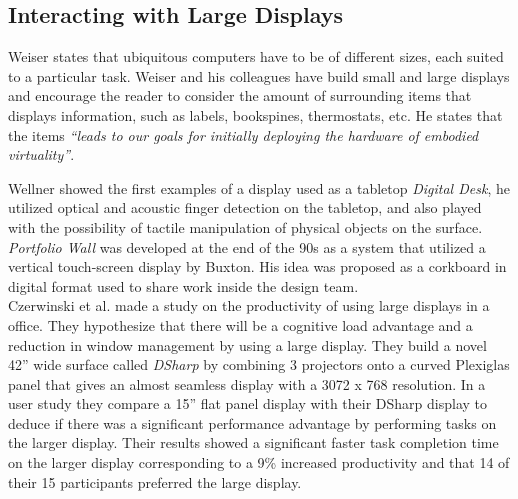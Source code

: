 \subsection{Interacting with Large Displays}
Weiser states that ubiquitous computers have to be of different sizes, each suited to a particular task. Weiser and his colleagues have build small and large displays and encourage the reader to consider the amount of surrounding items that displays information, such as labels, bookspines, thermostats, etc. He states that the items \emph{``leads to our goals for initially deploying the hardware of embodied virtuality''}.\cite{Weiser:1991} 

Wellner showed the first examples of a display used as a tabletop \emph{Digital Desk}, he utilized optical and acoustic finger detection on the tabletop, and also played with the possibility of tactile manipulation of physical objects on the surface.\cite{Wellner:1993} \emph{Portfolio Wall} was developed at the end of the 90s as a system that utilized a vertical touch-screen display by Buxton\cite{Buxton:2000}. His idea was proposed as a corkboard in digital format used to share work inside the design team.\\ %

Czerwinski et al. made a study on the productivity of using large displays in a office. They hypothesize that there will be a cognitive load advantage and a reduction in window management by using a large display. They build a novel 42'' wide surface called \emph{DSharp} by combining 3 projectors onto a curved Plexiglas panel that gives an almost seamless display with a 3072 x 768 resolution. In a user study they compare a 15'' flat panel display with their DSharp display to deduce if there was a significant performance advantage by performing tasks on the larger display. Their results showed a significant faster task completion time on the larger display corresponding to a 9\% increased productivity and that 14 of their 15 participants preferred the large display.

